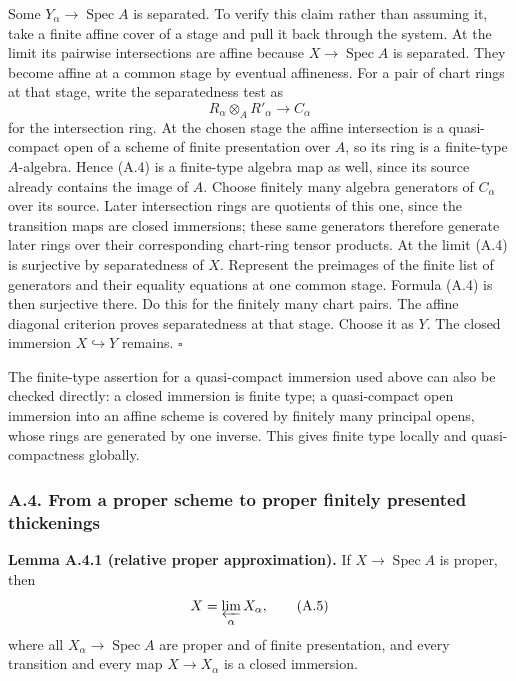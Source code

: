 \documentclass[11pt]{article}
\begin{document}
Some \(Y_\alpha\to\operatorname{Spec}A\) is separated. To verify this
claim rather than assuming it, take a finite affine cover of a stage and
pull it back through the system. At the limit its pairwise intersections
are affine because \(X\to\operatorname{Spec}A\) is separated. They
become affine at a common stage by eventual affineness. For a pair of
chart rings at that stage, write the separatedness test as \[
R_\alpha\otimes_A R'_\alpha\longrightarrow C_\alpha
\tag{A.4}
\] for the intersection ring. At the chosen stage the affine
intersection is a quasi-compact open of a scheme of finite presentation
over \(A\), so its ring is a finite-type \(A\)-algebra. Hence (A.4) is a
finite-type algebra map as well, since its source already contains the
image of \(A\). Choose finitely many algebra generators of \(C_\alpha\)
over its source. Later intersection rings are quotients of this one,
since the transition maps are closed immersions; these same generators
therefore generate later rings over their corresponding chart-ring
tensor products. At the limit (A.4) is surjective by separatedness of
\(X\). Represent the preimages of the finite list of generators and
their equality equations at one common stage. Formula (A.4) is then
surjective there. Do this for the finitely many chart pairs. The affine
diagonal criterion proves separatedness at that stage. Choose it as
\(Y\). The closed immersion \(X\hookrightarrow Y\) remains. \(\square\)

The finite-type assertion for a quasi-compact immersion used above can
also be checked directly: a closed immersion is finite type; a
quasi-compact open immersion into an affine scheme is covered by
finitely many principal opens, whose rings are generated by one inverse.
This gives finite type locally and quasi-compactness globally.

\subsubsection{A.4. From a proper scheme to proper finitely presented
thickenings}\label{a.4.-from-a-proper-scheme-to-proper-finitely-presented-thickenings}

\textbf{Lemma A.4.1 (relative proper approximation).} If
\(X\to\operatorname{Spec}A\) is proper, then \[
X=\varprojlim_\alpha X_\alpha,
\tag{A.5}
\] where all \(X_\alpha\to\operatorname{Spec}A\) are proper and of
finite presentation, and every transition and every map
\(X\to X_\alpha\) is a closed immersion.
\end{document}
